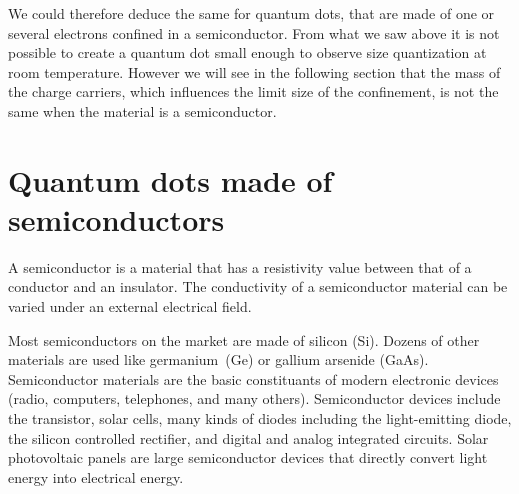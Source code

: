 We could therefore deduce the same for quantum dots, that are made of one or several electrons confined in a semiconductor. From what we saw above it is not possible to create a quantum dot small enough to observe size quantization at room temperature. However we will see in the following section that the mass of the charge carriers, which influences the limit size of the confinement, is not the same when the material is a semiconductor.


\section{Quantum dots made of semiconductors}
\label{semiconductors}
A semiconductor is a material that has a resistivity value between that of a conductor and an insulator. The conductivity of a semiconductor material can be varied under an external electrical field. 

Most semiconductors on the market are made of silicon (Si). Dozens of other materials are used like germanium~(Ge) or gallium arsenide (GaAs).
Semiconductor materials are the basic constituants of modern electronic devices (radio, computers, telephones, and many others). Semiconductor devices include the transistor, solar cells, many kinds of diodes including the light-emitting diode, the silicon controlled rectifier, and digital and analog integrated circuits. Solar photovoltaic panels are large semiconductor devices that directly convert light energy into electrical energy.

